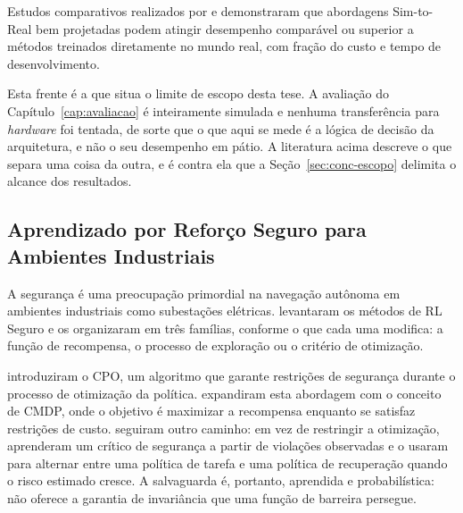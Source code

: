 Estudos comparativos realizados por \cite{Hwangbo2019} e  demonstraram que abordagens Sim-to-Real bem projetadas podem atingir desempenho comparável ou superior a métodos treinados diretamente no mundo real, com fração do custo e tempo de desenvolvimento.

Esta frente é a que situa o limite de escopo desta tese. A avaliação do
Capítulo~\ref{cap:avaliacao} é inteiramente simulada e nenhuma transferência para
\textit{hardware} foi tentada, de sorte que o que aqui se mede é a lógica de decisão da
arquitetura, e não o seu desempenho em pátio. A literatura acima descreve o que separa
uma coisa da outra, e é contra ela que a Seção~\ref{sec:conc-escopo} delimita o alcance
dos resultados.

\subsection{Aprendizado por Reforço Seguro para Ambientes Industriais}

A segurança é uma preocupação primordial na navegação autônoma em ambientes industriais como subestações elétricas.  levantaram os métodos de \ac{RL} Seguro e os organizaram em três famílias, conforme o que cada uma modifica: a função de recompensa, o processo de exploração ou o critério de otimização.

 introduziram o \ac{CPO}, um algoritmo que garante restrições de segurança durante o processo de otimização da política.  expandiram esta abordagem com o conceito de \ac{CMDP}, onde o objetivo é maximizar a recompensa enquanto se satisfaz restrições de custo. %
 seguiram outro caminho: em vez de restringir a
otimização, aprenderam um crítico de segurança a partir de violações observadas e o
usaram para alternar entre uma política de tarefa e uma política de recuperação quando
o risco estimado cresce. A salvaguarda é, portanto, aprendida e probabilística: não
oferece a garantia de invariância que uma função de barreira persegue.

